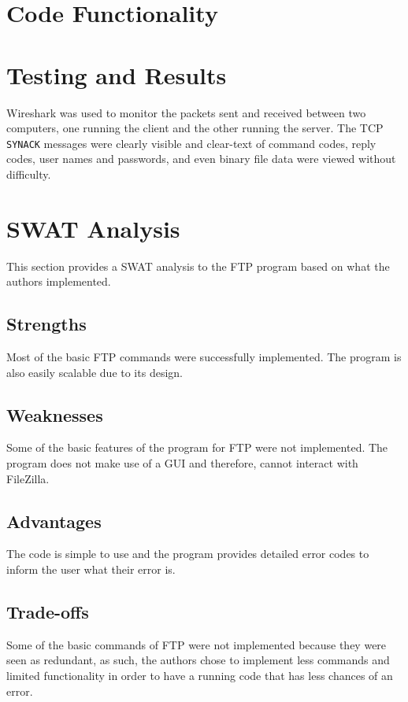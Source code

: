 \documentclass[journal, a4paper]{IEEEtran}
\begin{document}
\section{Code Functionality}



\section{Testing and Results}
Wireshark was used to monitor the packets sent and received between two computers, one running the client and the other running the server. The TCP \texttt{SYNACK} messages were clearly visible and clear-text of command codes, reply codes, user names and passwords, and even binary file data were viewed without difficulty.


\section{SWAT Analysis}

This section provides a SWAT analysis to the FTP program based on what the authors implemented. 

\subsection{Strengths}
Most of the basic FTP commands were successfully implemented. The program is also easily scalable due to its design.

\subsection{Weaknesses}
Some of the basic features of the program for FTP were not implemented. The program does not make use of a GUI and therefore, cannot interact with FileZilla. 

\subsection{Advantages}
The code is simple to use and the program provides detailed error codes to inform the user what their error is.


\subsection{Trade-offs}
Some of the basic commands of FTP were not implemented because they were seen as redundant, as such, the authors chose to implement less commands and limited functionality in order to have a running code that has less chances of an error. 
\end{document}
